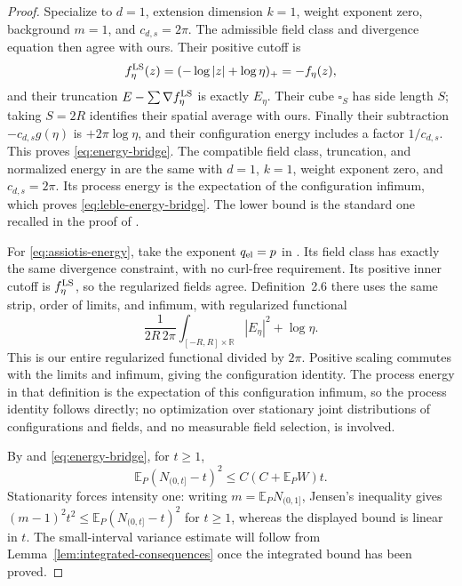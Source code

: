 \documentclass[11pt,reqno]{amsart}
\numberwithin{equation}{section}
\theoremstyle{definition}
\theoremstyle{remark}
\newcommand{\R}{\mathbb R}
\newcommand{\E}{\mathbb E}
\newcommand{\1}{\mathbf 1}
\begin{document}
\begin{proof}
Specialize \cite[Sections~2.6.4--2.7.4]{LS} to $d=1$, extension
dimension $k=1$, weight exponent zero, background $m=1$, and
$c_{d,s}=2\pi$. The admissible field class and divergence equation
then agree with ours. Their positive cutoff is
\[
f_\eta^{\rm LS}(z)=(-\log|z|+\log\eta)_+=-f_\eta(z),
\]
and their truncation $E-\sum\nabla f_\eta^{\rm LS}$ is exactly
$E_\eta$. Their cube $\square_S$ has side length $S$; taking $S=2R$
identifies their spatial average with ours. Finally their subtraction
$-c_{d,s}g(\eta)$ is $+2\pi\log\eta$, and their configuration energy
includes a factor $1/c_{d,s}$. This proves \eqref{eq:energy-bridge}.
The compatible field class, truncation, and normalized energy in
\cite[Sections~2.5 and~3.1]{Leble} are the same with
$d=1$, $k=1$, weight exponent zero, and $c_{d,s}=2\pi$.
Its process energy is the expectation of the configuration infimum,
which proves \eqref{eq:leble-energy-bridge}.
The lower bound is the standard one recalled in the proof of
\cite[Lemma~3.9]{LS}.

For \eqref{eq:assiotis-energy}, take the exponent $q_{\rm el}=p$ in
\cite[Definition~2.5]{Assiotis}. Its field class has exactly the same
divergence constraint, with no curl-free requirement. Its positive
inner cutoff is $f_\eta^{\rm LS}$, so the regularized fields agree.
Definition~2.6 there uses the same strip, order of limits, and infimum,
with regularized functional
\[
\frac1{2R\,2\pi}\int_{[-R,R]\times\R}|E_\eta|^2
+\log\eta.
\]
This is our entire regularized functional divided by $2\pi$.
Positive scaling commutes with the limits and infimum, giving the
configuration identity. The process energy in that definition is the
expectation of this configuration infimum, so the process identity
follows directly; no optimization over stationary joint distributions of configurations and
fields, and no measurable field selection, is involved.

By \cite[Lemma~3.2]{LS} and \eqref{eq:energy-bridge}, for $t\ge1$,
\[
\E_P(N_{(0,t]}-t)^2\le C(C+\E_PW)t.
\]
Stationarity forces intensity one: writing $m=\E_PN_{(0,1]}$,
Jensen's inequality gives $(m-1)^2t^2\le\E_P(N_{(0,t]}-t)^2$
for $t\ge1$, whereas the displayed bound is linear in $t$.
The small-interval variance estimate will follow from
Lemma~\ref{lem:integrated-consequences} once the integrated bound
has been proved.
\end{proof}
\end{document}
